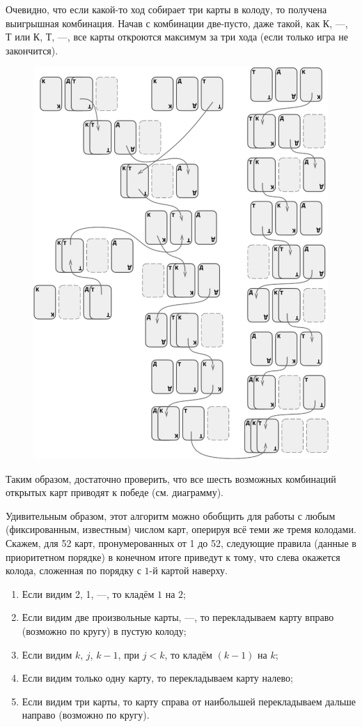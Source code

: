 Очевидно, что если какой-то ход собирает три карты в колоду, то получена выигрышная комбинация.
Начав с комбинации две-пусто, даже такой, как К, ---, Т или
К, Т, ---, все карты откроются максимум за три хода (если только игра не закончится).
\begin{figure}[h!]
\centering
\includegraphics[scale=0.55]{Figs/Handicaps/conway-ru}
\end{figure}
Таким образом, достаточно проверить, что все шесть возможных комбинаций открытых карт приводят к победе  (см. диаграмму).
\heart

Удивительным образом, этот алгоритм можно обобщить для работы с любым (фиксированным, известным) числом карт, оперируя всё теми же тремя колодами.
Скажем, для 52 карт, пронумерованных от 1 до 52, следующие правила (данные в приоритетном порядке) в конечном итоге приведут к тому, что слева окажется колода, сложенная по порядку с $1$-й картой наверху.

\begin{enumerate}[(1)]
\item Если видим 2, 1, ---, то кладём $1$ на $2$;
\item Если видим две произвольные карты, ---, то перекладываем карту вправо (возможно по кругу) в пустую колоду;
\item Если видим $k$, $j$, $k-1$, при $j < k$, то кладём $(k-1)$ на $k$;
\item Если видим только одну карту, то перекладываем карту налево;
\item Если видим три карты, то карту справа от наибольшей перекладываем дальше направо (возможно по кругу).
\end{enumerate}

